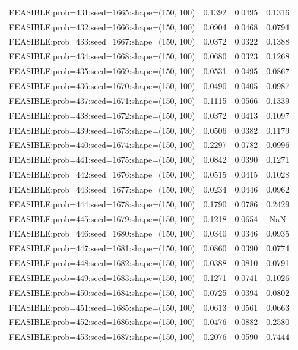 \begin{longtable}{lccc}
FEASIBLE:prob=431:seed=1665:shape=(150, 100) & 0.1392 & 0.0495 & 0.1316 \\
FEASIBLE:prob=432:seed=1666:shape=(150, 100) & 0.0904 & 0.0468 & 0.0794 \\
FEASIBLE:prob=433:seed=1667:shape=(150, 100) & 0.0372 & 0.0322 & 0.1388 \\
FEASIBLE:prob=434:seed=1668:shape=(150, 100) & 0.0680 & 0.0323 & 0.1268 \\
FEASIBLE:prob=435:seed=1669:shape=(150, 100) & 0.0531 & 0.0495 & 0.0867 \\
FEASIBLE:prob=436:seed=1670:shape=(150, 100) & 0.0490 & 0.0405 & 0.0987 \\
FEASIBLE:prob=437:seed=1671:shape=(150, 100) & 0.1115 & 0.0566 & 0.1339 \\
FEASIBLE:prob=438:seed=1672:shape=(150, 100) & 0.0372 & 0.0413 & 0.1097 \\
FEASIBLE:prob=439:seed=1673:shape=(150, 100) & 0.0506 & 0.0382 & 0.1179 \\
FEASIBLE:prob=440:seed=1674:shape=(150, 100) & 0.2297 & 0.0782 & 0.0996 \\
FEASIBLE:prob=441:seed=1675:shape=(150, 100) & 0.0842 & 0.0390 & 0.1271 \\
FEASIBLE:prob=442:seed=1676:shape=(150, 100) & 0.0515 & 0.0415 & 0.1028 \\
FEASIBLE:prob=443:seed=1677:shape=(150, 100) & 0.0234 & 0.0446 & 0.0962 \\
FEASIBLE:prob=444:seed=1678:shape=(150, 100) & 0.1790 & 0.0786 & 0.2429 \\
FEASIBLE:prob=445:seed=1679:shape=(150, 100) & 0.1218 & 0.0654 &    NaN \\
FEASIBLE:prob=446:seed=1680:shape=(150, 100) & 0.0340 & 0.0346 & 0.0935 \\
FEASIBLE:prob=447:seed=1681:shape=(150, 100) & 0.0860 & 0.0390 & 0.0774 \\
FEASIBLE:prob=448:seed=1682:shape=(150, 100) & 0.0388 & 0.0810 & 0.0791 \\
FEASIBLE:prob=449:seed=1683:shape=(150, 100) & 0.1271 & 0.0741 & 0.1026 \\
FEASIBLE:prob=450:seed=1684:shape=(150, 100) & 0.0725 & 0.0394 & 0.0802 \\
FEASIBLE:prob=451:seed=1685:shape=(150, 100) & 0.0613 & 0.0561 & 0.0663 \\
FEASIBLE:prob=452:seed=1686:shape=(150, 100) & 0.0476 & 0.0882 & 0.2580 \\
FEASIBLE:prob=453:seed=1687:shape=(150, 100) & 0.2076 & 0.0590 & 0.7444 \\

\end{longtable}
